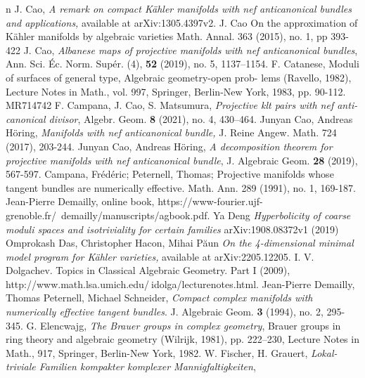\documentclass[a4, 12pt]{amsart}
\numberwithin{equation}{section}
\theoremstyle{definition}
\begin{document}
\begin{thebibliography}{n}
J. Cao,
\textit{ A remark on compact K\"ahler manifolds with nef anticanonical bundles and applications,} 
available at arXiv:1305.4397v2.
J. Cao
On the approximation of K\"ahler manifolds by algebraic varieties  Math. Annal. 363 (2015), no. 1, pp 393-422
J. Cao, 
\textit{Albanese maps of projective manifolds with nef anticanonical bundles}, 
Ann. Sci. \'Ec. Norm. Sup\'er. (4),  {\bf 52} (2019), no. 5, 1137--1154. 
F. Catanese, Moduli of surfaces of general type, Algebraic geometry-open prob-
lems (Ravello, 1982), Lecture Notes in Math., vol. 997, Springer, Berlin-New York,
1983, pp. 90-112. MR714742 
F. Campana, J. Cao, S. Matsumura,  
\textit{Projective klt pairs with nef anti-canonical divisor},
Algebr. Geom. {\bf 8}  (2021),  no. 4, 430--464.
Junyan Cao, Andreas H\"oring, 
\textit{ Manifolds with nef anticanonical bundle,} J. Reine
Angew. Math. 724 (2017), 203-244.
Junyan Cao, Andreas H\"oring, 
\textit{A decomposition theorem for projective manifolds with nef anticanonical bundle}, 
J. Algebraic Geom. {\bf 28} (2019), 567-597. 
Campana, Fr\'ed\'eric; Peternell, Thomas;
Projective manifolds whose tangent bundles are numerically effective.
Math. Ann. 289 (1991), no. 1, 169-187. 
Jean-Pierre Demailly,
\newblock online book, https://www-fourier.ujf-grenoble.fr/~demailly/manuscripts/agbook.pdf.
Ya Deng
\textit{Hyperbolicity of coarse moduli spaces and isotriviality for certain families}
 arXiv:1908.08372v1 (2019)
Omprokash Das, Christopher Hacon, Mihai P\u{a}un
\textit{ On the 4-dimensional minimal model program for K\"ahler varieties,} 
available at arXiv:2205.12205.
I. V. Dolgachev. Topics in Classical Algebraic Geometry. Part I (2009),
http://www.math.lsa.umich.edu/$~$idolga/lecturenotes.html.
Jean-Pierre Demailly, Thomas Peternell, Michael Schneider, \emph{Compact complex manifolds with numerically effective tangent bundles}. J. Algebraic Geom. {\bf{3}} (1994), no. 2, 295-345. 
G. Elencwajg, 
\textit{The Brauer groups in complex geometry}, 
Brauer groups in ring theory and algebraic geometry (Wilrijk, 1981), pp. 222--230,
Lecture Notes in Math., 917, Springer, Berlin-New York, 1982.
W. Fischer, H. Grauert, 
\textit{Lokal-triviale Familien kompakter komplexer Mannigfaltigkeiten}, 

\end{thebibliography}
\end{document}
